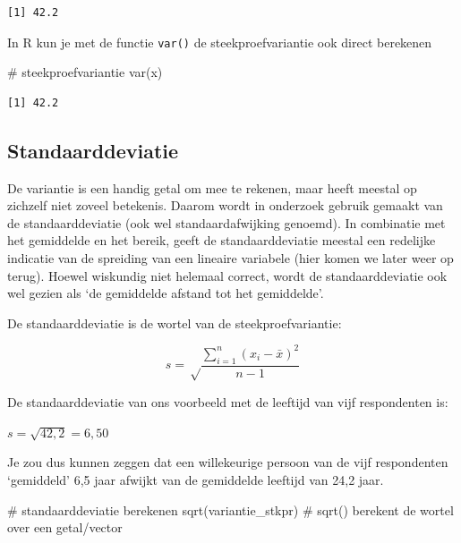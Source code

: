 \documentclass[
  letterpaper,
  DIV=11,
  numbers=noendperiod]{scrreprt}
\newenvironment{Shaded}{\begin{snugshade}}{\end{snugshade}}
\newcommand{\CommentTok}[1]{\textcolor[rgb]{0.37,0.37,0.37}{#1}}
\newcommand{\FunctionTok}[1]{\textcolor[rgb]{0.28,0.35,0.67}{#1}}
\newcommand{\NormalTok}[1]{\textcolor[rgb]{0.00,0.23,0.31}{#1}}
\begin{document}
\begin{verbatim}
[1] 42.2
\end{verbatim}

In R kun je met de functie \texttt{var()} de steekproefvariantie ook
direct berekenen

\begin{Shaded}
\begin{Highlighting}[]
\CommentTok{\# steekproefvariantie }
\FunctionTok{var}\NormalTok{(x)}
\end{Highlighting}
\end{Shaded}

\begin{verbatim}
[1] 42.2
\end{verbatim}

\subsection{Standaarddeviatie}\label{standaarddeviatie}

De variantie is een handig getal om mee te rekenen, maar heeft meestal
op zichzelf niet zoveel betekenis. Daarom wordt in onderzoek gebruik
gemaakt van de standaarddeviatie (ook wel standaardafwijking genoemd).
In combinatie met het gemiddelde en het bereik, geeft de
standaarddeviatie meestal een redelijke indicatie van de spreiding van
een lineaire variabele (hier komen we later weer op terug). Hoewel
wiskundig niet helemaal correct, wordt de standaarddeviatie ook wel
gezien als `de gemiddelde afstand tot het gemiddelde'.

De standaarddeviatie is de wortel van de steekproefvariantie:

\[
s=\sqrt\frac{\sum_{i=1}^{n}{(x_i-\bar{x})^2}}{n-1}
\]

De standaarddeviatie van ons voorbeeld met de leeftijd van vijf
respondenten is:

\(s=\sqrt{42,2}=6,50\)

Je zou dus kunnen zeggen dat een willekeurige persoon van de vijf
respondenten `gemiddeld' 6,5 jaar afwijkt van de gemiddelde leeftijd van
24,2 jaar.

\begin{Shaded}
\begin{Highlighting}[]
\CommentTok{\# standaarddeviatie berekenen}
\FunctionTok{sqrt}\NormalTok{(variantie\_stkpr) }\CommentTok{\# sqrt() berekent de wortel over een getal/vector}
\end{Highlighting}
\end{Shaded}
\end{document}
